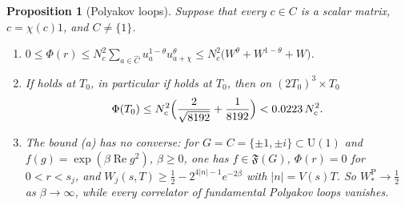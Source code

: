 \documentclass[11pt,a4paper]{amsart}
\newtheorem{proposition}[theorem]{Proposition}
\theoremstyle{definition}
\theoremstyle{remark}
\numberwithin{equation}{section}
\newcommand{\Fclass}{\mathfrak{F}}   %
\newcommand{\U}{\mathrm{U}}                %
\newcommand{\Vol}[1]{V(#1)}                %
\newcommand{\cube}[1]{(2#1)^3}             %
\newcommand{\Mcirc}{\text{\upshape(M$^{\circ}$)}}   %
\newcommand{\Bcirc}{\text{\upshape(B$^{\circ}$)}}   %
\begin{document}
\begin{proposition}[Polyakov loops]\label{prop:polyakov-bound}
Suppose that every $c\in C$ is a scalar matrix, $c=\chi(c)1$, and $C\ne\{1\}$.
\begin{enumerate}[label=\textup{(\alph*)},leftmargin=*]
\item $0\le\Phi(r)\le N_c^2\sum_{a\in\widehat C}u_a^{1-\theta}u_{a+\chi}^{\theta}\le N_c^2\bigl(W^\theta+W^{1-\theta}+W\bigr)$.
\item If \Bcirc{} holds at $T_0$, in particular if \Mcirc{} holds at $T_0$, then on $\cube{T_0}\times T_0$
\[
\Phi(T_0)\le N_c^2\Bigl(\frac2{\sqrt{8192}}+\frac1{8192}\Bigr)<0.0223\,N_c^2 .
\]
\item The bound \textup{(a)} has no converse: for $G=C=\{\pm1,\pm i\}\subset\U(1)$ and $f(g)=\exp(\beta\operatorname{Re}g^2)$, $\beta\ge0$, one has $f\in\Fclass(G)$, $\Phi(r)=0$ for $0<r<s_j$, and $W_j(s,T)\ge\frac12-2^{4|n|-1}e^{-2\beta}$ with $|n|=\Vol{s}T$. So $W^{\mathrm P}_*\to\frac12$ as $\beta\to\infty$, while every correlator of fundamental Polyakov loops vanishes.
\end{enumerate}
\end{proposition}
\end{document}
